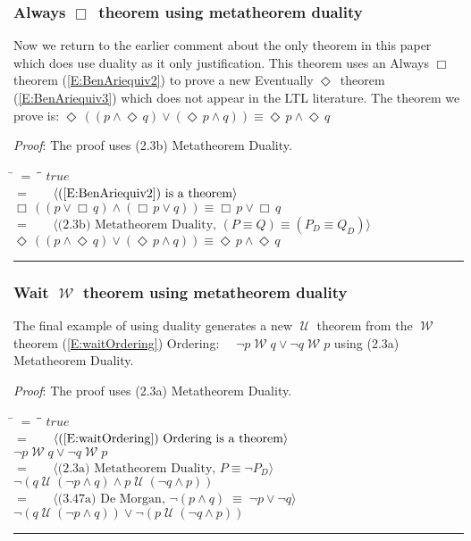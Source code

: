 \documentclass[12pt, fleqn, leqno]{article}
\newcommand{\lgap}{2pt}                             %
\newcommand{\mymathindent}{24pt}                    %
\newcommand{\equivs}{\ensuremath{\;\equiv\;}}       %
\newcommand{\Until}{\;\mathcal{U}\;}
\newcommand{\Wait}{\;\mathcal{W}\;}
\newcommand{\Event}{\Diamond\,}
\newcommand{\Always}{\Box\,}
\newcommand{\myqed}{\rule[-.23ex]{1.2ex}{2.0ex}}
\newcommand{\myqedtab}{\hspace{384pt}}              %
\newcommand{\Gll} {\langle}                         %
\newcommand{\Ggg} {\rangle}                         %
\newcommand{\Hint}[1]     {\ \ \ $\Gll              \mbox{#1} \Ggg$ }   %
\begin{document}
\subsubsection*{Always $\Always$ theorem using metatheorem duality}\label{section-duality-always}

Now we return to the earlier comment about the only theorem in this paper which does use
duality as it only justification. This theorem uses an Always $\Always$ theorem (\ref{E:BenAriequiv2})
to prove a new Eventually $\Event$ theorem (\ref{E:BenAriequiv3}) which does not appear in the LTL literature.
The theorem we prove is: $\Event ((p \land \Event q) \lor (\Event p \land q)) \equiv \Event p \land \Event q$

\emph{Proof}: The proof uses (2.3b) Metatheorem Duality.
\begin{tabbing}
\hspace{\mymathindent} \= $= \;$ \= \myqedtab \= \kill
  \> \>   $true$\\[\lgap]
  \> $=$  \>  \Hint{(\ref{E:BenAriequiv2}) is a theorem}\\[\lgap]
  \> \>   $\Always ((p \lor \Always q) \land (\Always p \lor q)) \equiv \Always p \lor \Always q$\\[\lgap]
    \> $=$  \>  \Hint{(2.3b) Metatheorem Duality, $(P \equiv Q) \equiv (P_D \equiv Q_D)$}\\[\lgap]
    \> \>   $\Event ((p \land \Event q) \lor (\Event p \land q)) \equiv \Event p \land \Event q$ \quad \myqed
\end{tabbing}

\subsubsection*{Wait $\Wait$ theorem using metatheorem duality}\label{section-duality-wait}

The final example of using duality generates a new $\Until$ theorem from the $\Wait$ theorem
(\ref{E:waitOrdering}) Ordering: $\quad \neg p \Wait q \lor \neg q \Wait p$ using (2.3a) Metatheorem Duality.

\emph{Proof}: The proof uses (2.3a) Metatheorem Duality.
\begin{tabbing}
\hspace{\mymathindent} \= $= \;$ \= \myqedtab \= \kill
  \> \>   $true$\\[\lgap]
  \> $=$  \>  \Hint{(\ref{E:waitOrdering}) Ordering is a theorem}\\[\lgap]
  \> \>   $\neg p \Wait q \lor \neg q \Wait p$\\[\lgap]
    \> $=$  \>  \Hint{(2.3a) Metatheorem Duality, $P \equiv \neg P_D$}\\[\lgap]
    \> \>   $\neg (q \Until (\neg p \land q) \land p \Until (\neg q \land p))$ \\[\lgap]
    \> $=$  \>  \Hint{(3.47a) De Morgan, $\neg(p\land q)\equivs \neg p\lor\neg q$}\\[\lgap]
  \> \>   $\neg (q \Until (\neg p \land q)) \lor \neg (p \Until (\neg q \land p))$\quad \myqed
\end{tabbing}
\end{document}
